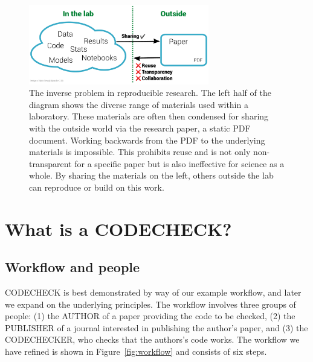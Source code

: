 \documentclass[12pt]{article}
\begin{document}
\begin{figure}
  \centering
  \includegraphics[width=0.7\textwidth]{figs/rr.pdf}
  \caption{The inverse problem in reproducible research. The left
  half of the diagram shows the diverse range of materials used
  within a laboratory. These materials are often then
  condensed for sharing with the outside world via the
  research paper, a static PDF document. Working backwards from the
  PDF to the underlying materials is impossible. This prohibits reuse
  and is not only non-transparent for a specific paper but is also 
  ineffective for science as a whole. By sharing the
  materials on the left, others outside the lab can reproduce
  or build on this work.}
  \label{fig:inverse}
\end{figure}

\section*{What is a CODECHECK?}\label{what-is-a-codecheck}

\subsection*{Workflow and people}\label{workflow-people}

CODECHECK is best demonstrated by way of our example workflow, and later
we expand on the underlying principles. The workflow involves three
groups of people:
(1) the AUTHOR of a paper providing the code to be checked,
(2) the PUBLISHER of a journal interested in publishing the author's paper, and
(3) the CODECHECKER, who checks that the authors's code works.
The workflow we have refined is shown in Figure~\ref{fig:workflow}
and consists of six steps.
\end{document}
